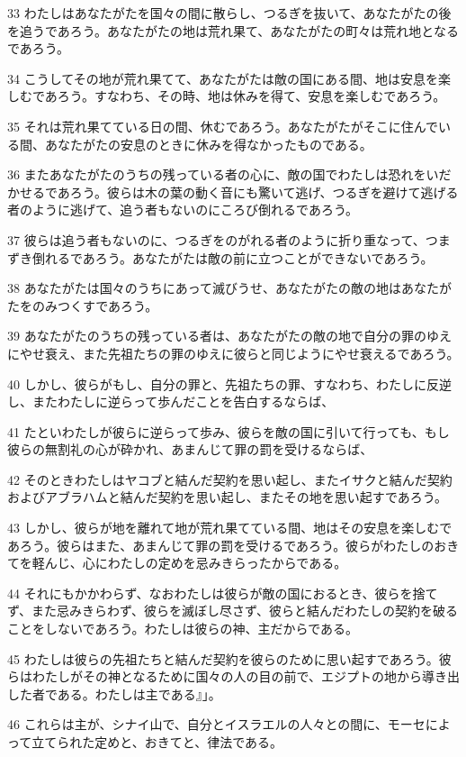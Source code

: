 \par 33 わたしはあなたがたを国々の間に散らし、つるぎを抜いて、あなたがたの後を追うであろう。あなたがたの地は荒れ果て、あなたがたの町々は荒れ地となるであろう。
\par 34 こうしてその地が荒れ果てて、あなたがたは敵の国にある間、地は安息を楽しむであろう。すなわち、その時、地は休みを得て、安息を楽しむであろう。
\par 35 それは荒れ果てている日の間、休むであろう。あなたがたがそこに住んでいる間、あなたがたの安息のときに休みを得なかったものである。
\par 36 またあなたがたのうちの残っている者の心に、敵の国でわたしは恐れをいだかせるであろう。彼らは木の葉の動く音にも驚いて逃げ、つるぎを避けて逃げる者のように逃げて、追う者もないのにころび倒れるであろう。
\par 37 彼らは追う者もないのに、つるぎをのがれる者のように折り重なって、つまずき倒れるであろう。あなたがたは敵の前に立つことができないであろう。
\par 38 あなたがたは国々のうちにあって滅びうせ、あなたがたの敵の地はあなたがたをのみつくすであろう。
\par 39 あなたがたのうちの残っている者は、あなたがたの敵の地で自分の罪のゆえにやせ衰え、また先祖たちの罪のゆえに彼らと同じようにやせ衰えるであろう。
\par 40 しかし、彼らがもし、自分の罪と、先祖たちの罪、すなわち、わたしに反逆し、またわたしに逆らって歩んだことを告白するならば、
\par 41 たといわたしが彼らに逆らって歩み、彼らを敵の国に引いて行っても、もし彼らの無割礼の心が砕かれ、あまんじて罪の罰を受けるならば、
\par 42 そのときわたしはヤコブと結んだ契約を思い起し、またイサクと結んだ契約およびアブラハムと結んだ契約を思い起し、またその地を思い起すであろう。
\par 43 しかし、彼らが地を離れて地が荒れ果てている間、地はその安息を楽しむであろう。彼らはまた、あまんじて罪の罰を受けるであろう。彼らがわたしのおきてを軽んじ、心にわたしの定めを忌みきらったからである。
\par 44 それにもかかわらず、なおわたしは彼らが敵の国におるとき、彼らを捨てず、また忌みきらわず、彼らを滅ぼし尽さず、彼らと結んだわたしの契約を破ることをしないであろう。わたしは彼らの神、主だからである。
\par 45 わたしは彼らの先祖たちと結んだ契約を彼らのために思い起すであろう。彼らはわたしがその神となるために国々の人の目の前で、エジプトの地から導き出した者である。わたしは主である』」。
\par 46 これらは主が、シナイ山で、自分とイスラエルの人々との間に、モーセによって立てられた定めと、おきてと、律法である。

